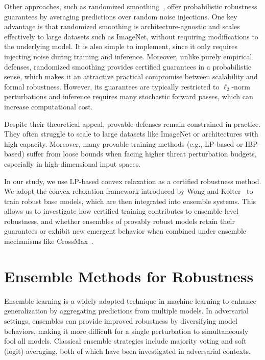 Other approaches, such as randomized smoothing~\cite{cohen2019certified}, offer probabilistic robustness guarantees by averaging predictions over random noise injections. One key advantage is that randomized smoothing is architecture-agnostic and scales effectively to large datasets such as ImageNet, without requiring modifications to the underlying model. It is also simple to implement, since it only requires injecting noise during training and inference. Moreover, unlike purely empirical defenses, randomized smoothing provides certified guarantees in a probabilistic sense, which makes it an attractive practical compromise between scalability and formal robustness. However, its guarantees are typically restricted to $\ell_2$-norm perturbations and inference requires many stochastic forward passes, which can increase computational cost.

Despite their theoretical appeal, provable defenses remain constrained in practice. They often struggle to scale to large datasets like ImageNet or architectures with high capacity. Moreover, many provable training methods (e.g., LP-based or IBP-based) suffer from loose bounds when facing higher threat perturbation budgets, especially in high-dimensional input spaces.


In our study, we use LP-based convex relaxation as a certified robustness method. We adopt the convex relaxation framework introduced by Wong and Kolter~\cite{wong2018provable} to train robust base models, which are then integrated into ensemble systems. This allows us to investigate how certified training contributes to ensemble-level robustness, and whether ensembles of provably robust models retain their guarantees or exhibit new emergent behavior when combined under ensemble mechanisms like CrossMax~\cite{fort2024ensemble}.




\section{Ensemble Methods for Robustness}
\indent

Ensemble learning is a widely adopted technique in machine learning to enhance generalization by aggregating predictions from multiple models. In adversarial settings, ensembles can provide improved robustness by diversifying model behaviors, making it more difficult for a single perturbation to simultaneously fool all models. Classical ensemble strategies include majority voting and soft (logit) averaging, both of which have been investigated in adversarial contexts.

